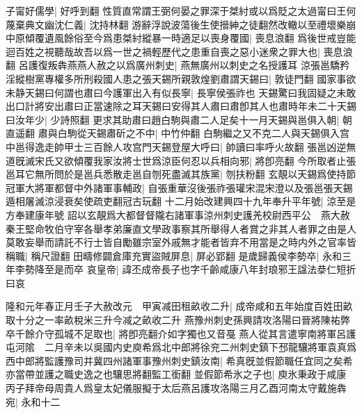 子甯好儒學|{
	好呼到翻}
性質直常謂王弼何晏之罪深于桀紂或以爲貶之太過甯曰王何蔑棄典文幽沈仁義|{
	沈持林翻}
游辭浮說波蕩後生使搢紳之徒翻然改轍以至禮壞樂崩中原傾覆遺風餘俗至今爲患桀紂縱暴一時適足以喪身覆國|{
	喪息浪翻}
爲後世戒豈能迴百姓之視聽哉故吾以爲一世之禍輕歷代之患重自喪之惡小迷衆之罪大也|{
	喪息浪翻}
呂護復叛犇燕燕人赦之以爲廣州刺史|{
	燕無廣州以刺史之名授護耳}
涼張邕驕矜淫縱樹黨專權多所刑殺國人患之張天錫所親敦煌劉肅謂天錫曰|{
	敦徒門翻}
國家事欲未静天錫曰何謂也肅曰今護軍出入有似長寧|{
	長寧侯張祚也}
天錫驚曰我固疑之未敢出口計將安出肅曰正當速除之耳天錫曰安得其人肅曰肅卽其人也肅時年未二十天錫曰汝年少|{
	少詩照翻}
更求其助肅曰趙白駒與肅二人足矣十一月天錫與邕俱入朝|{
	朝直遥翻}
肅與白駒從天錫肅斫之不中|{
	中竹仲翻}
白駒繼之又不克二人與天錫俱入宫中邕得逸走帥甲士三百餘人攻宫門天錫登屋大呼曰|{
	帥讀曰率呼火故翻}
張邕凶逆無道旣滅宋氏又欲傾覆我家汝將士世爲涼臣何忍以兵相向邪|{
	將卽亮翻}
今所取者止張邕耳它無所問於是邕兵悉散走邕自刎死盡滅其族黨|{
	刎扶粉翻}
玄靚以天錫爲使持節冠軍大將軍都督中外諸軍事輔政|{
	自張重華沒後張祚張瓘宋混宋澄以及張邕張天錫遁相屠滅涼浸衰矣使疏吏翻冠古玩翻}
十二月始改建興四十九年奉升平年號|{
	涼至是方奉建康年號}
詔以玄靚爲大都督督隴右諸軍事涼州刺史護羌校尉西平公　燕大赦秦王堅命牧伯守宰各舉孝弟廉直文學政事察其所舉得人者賞之非其人者罪之由是人莫敢妄舉而請託不行士皆自勵雖宗室外戚無才能者皆弃不用當是之時内外之官率皆稱職|{
	稱尺證翻}
田疇修闢倉庫充實盜賊屏息|{
	屏必郢翻}
是歲歸義侯李勢卒|{
	永和三年李勢降至是而卒}
哀皇帝|{
	諱丕成帝長子也字千齡咸康八年封琅邪王諡法㳟仁短折曰哀}


隆和元年春正月壬子大赦改元　甲寅减田租畝收二升|{
	成帝咸和五年始度百姓田畝取十分之一率畝稅米三升今减之畝收二升}
燕豫州刺史孫興請攻洛陽曰晉將陳祐弊卒千餘介守孤城不足取也|{
	將卽亮翻介如字獨也又音戞}
燕人從其言遣寧南將軍呂護屯河隂　二月辛未以吳國内史庾希爲北中郎將徐兖二州刺史鎮下邳龍驤將軍袁真爲西中郎將監護豫司并冀四州諸軍事豫州刺史鎮汝南|{
	希真旣並假節職任宜同之矣希亦當帶並護之職史逸之也驤思將翻監工銜翻}
並假節希氷之子也|{
	庾氷秉政于咸康}
丙子拜帝母周貴人爲皇太妃儀服擬于太后燕呂護攻洛陽三月乙酉河南太守戴施犇宛|{
	永和十二}


